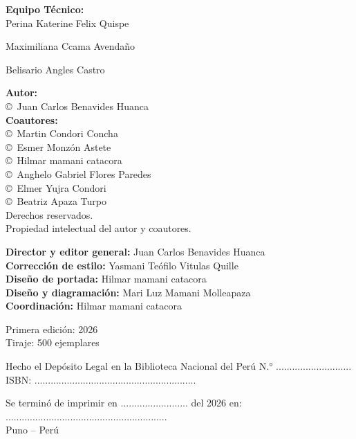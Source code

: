 \begin{flushleft}
{		\textbf{Equipo Técnico:}\\
		
	
		
		
		Perina Katerine Felix Quispe
		
		Maximiliana Ccama Avendaño
		
		Belisario Angles Castro
		
		
			

		\vspace{0.15cm}
		
		\textbf{Autor:} \\
		
		\copyright\ Juan Carlos Benavides Huanca\\
		
		\textbf{Coautores:}\\
		\copyright\ Martin Condori Concha\\
		\copyright\ Esmer Monzón Astete \\
		\copyright\ Hilmar mamani catacora\\
		\copyright\ Anghelo Gabriel Flores Paredes \\
		\copyright\ Elmer Yujra Condori \\
		\copyright\ Beatriz Apaza Turpo\\
	
		
		Derechos reservados.\\
		Propiedad intelectual del autor y coautores.
		
	\vspace{0.15cm}
		
		\textbf{Director y editor general:} Juan Carlos Benavides Huanca\\
		\textbf{Corrección de estilo:} Yasmani Teófilo Vitulas Quille\\
		\textbf{Diseño de portada:} Hilmar mamani catacora\\
		\textbf{Diseño y diagramación:}	Mari Luz Mamani Molleapaza\\
		\textbf{Coordinación:} Hilmar mamani catacora
		
		\vspace{0.15cm}
		
		Primera edición: 2026\\
		Tiraje: 500 ejemplares
		
		\vspace{0.35cm}
		
		Hecho el Depósito Legal en la Biblioteca Nacional del Perú N.° ............................\\
		ISBN: ............................................................
		
		\vspace{0.25cm}
		
		Se terminó de imprimir en ......................... del 2026 en:\\
		............................................................\\

		Puno -- Perú
		
	}
\end{flushleft}

